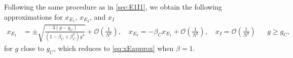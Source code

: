 \documentclass[reqno]{siamonline190516}
\begin{document}
Following the same procedure as in \cref{sec:E1I1}, we obtain the following approximations for $x_{E_1}$, $x_{E_2}$, and $x_I$
\begin{align}\label{eq:XE1}
x_{E_1} &= \pm \sqrt{ \frac{ 3(g - g_C) }{ (1 - \beta_C + \beta_C^2 )g^3}} + \mathcal{O}\left( \frac{1}{N^2}\right), \quad
x_{E_2} = -\beta_C x_{E_1} + \mathcal{O}\left( \frac{1}{N^2} \right), \quad
x_I = \mathcal{O}\left( \frac{1}{N^2} \right)
&& g \geq g_C,
\end{align}
for $g$ close to $g_C$, which reduces to \cref{eq:xEapprox} when $\beta = 1$.
\end{document}
